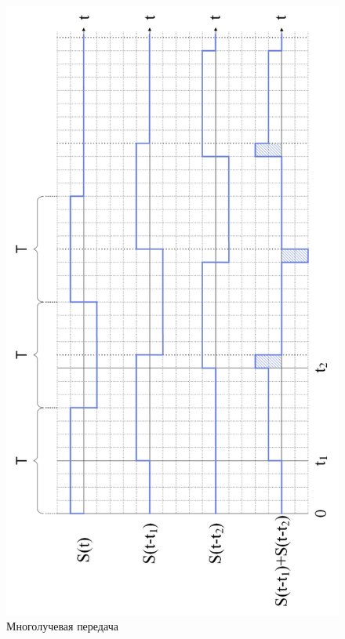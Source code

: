 \begin{figure}[h]
	\centering
	\includegraphics[width=0.75\linewidth]{img/time_scheme}
	\caption{Многолучевая передача}
	\label{fig:time_scheme}
\end{figure}